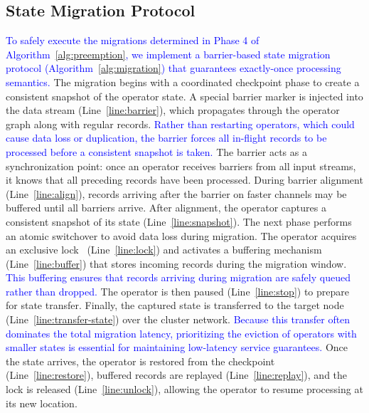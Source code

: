 \documentclass[lettersize,journal]{IEEEtran}
\begin{document}
\subsection{State Migration Protocol} 
\label{subsec:state_migration}
\textcolor{blue}{To safely execute the migrations determined in Phase 4 of Algorithm~\ref{alg:preemption}, we implement a barrier-based state migration protocol (Algorithm~\ref{alg:migration}) that guarantees exactly-once processing semantics.} 
The migration begins with a coordinated checkpoint phase to create a consistent snapshot of the operator state. A special barrier marker is injected into the data stream (Line~\ref{line:barrier}), which propagates through the operator graph along with regular records. \textcolor{blue}{Rather than restarting operators, which could cause data loss or duplication, the barrier forces all in-flight records to be processed before a consistent snapshot is taken.} 
The barrier acts as a synchronization point: once an operator receives barriers from all input streams, it knows that all preceding records have been processed. During barrier alignment (Line~\ref{line:align}), records arriving after the barrier on faster channels may be buffered until all barriers arrive. After alignment, the operator captures a consistent snapshot of its state (Line~\ref{line:snapshot}).
The next phase performs an atomic switchover to avoid data loss during migration. The operator acquires an exclusive lock~\cite{hoffmann2019megaphone} (Line~\ref{line:lock}) and activates a buffering mechanism (Line~\ref{line:buffer}) that stores incoming records during the migration window. \textcolor{blue}{This buffering ensures that records arriving during migration are safely queued rather than dropped.} The operator is then paused (Line~\ref{line:stop}) to prepare for state transfer.
Finally, the captured state is transferred to the target node (Line~\ref{line:transfer-state}) over the cluster network. \textcolor{blue}{Because this transfer often dominates the total migration latency, prioritizing the eviction of operators with smaller states is essential for maintaining low-latency service guarantees.} Once the state arrives, the operator is restored from the checkpoint (Line~\ref{line:restore}), buffered records are replayed (Line~\ref{line:replay}), and the lock is released (Line~\ref{line:unlock}), allowing the operator to resume processing at its new location.
\end{document}
